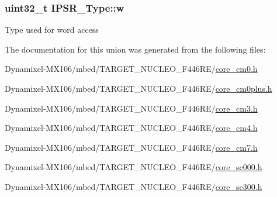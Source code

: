 \subsubsection[{\texorpdfstring{w}{w}}]{\setlength{\rightskip}{0pt plus 5cm}uint32\+\_\+t I\+P\+S\+R\+\_\+\+Type\+::w}\hypertarget{union_i_p_s_r___type_a4adca999d3a0bc1ae682d73ea7cfa879}{}\label{union_i_p_s_r___type_a4adca999d3a0bc1ae682d73ea7cfa879}
Type used for word access 

The documentation for this union was generated from the following files\+:\begin{DoxyCompactItemize}
\item 
Dynamixel-\/\+M\+X106/mbed/\+T\+A\+R\+G\+E\+T\+\_\+\+N\+U\+C\+L\+E\+O\+\_\+\+F446\+R\+E/\hyperlink{core__cm0_8h}{core\+\_\+cm0.\+h}\item 
Dynamixel-\/\+M\+X106/mbed/\+T\+A\+R\+G\+E\+T\+\_\+\+N\+U\+C\+L\+E\+O\+\_\+\+F446\+R\+E/\hyperlink{core__cm0plus_8h}{core\+\_\+cm0plus.\+h}\item 
Dynamixel-\/\+M\+X106/mbed/\+T\+A\+R\+G\+E\+T\+\_\+\+N\+U\+C\+L\+E\+O\+\_\+\+F446\+R\+E/\hyperlink{core__cm3_8h}{core\+\_\+cm3.\+h}\item 
Dynamixel-\/\+M\+X106/mbed/\+T\+A\+R\+G\+E\+T\+\_\+\+N\+U\+C\+L\+E\+O\+\_\+\+F446\+R\+E/\hyperlink{core__cm4_8h}{core\+\_\+cm4.\+h}\item 
Dynamixel-\/\+M\+X106/mbed/\+T\+A\+R\+G\+E\+T\+\_\+\+N\+U\+C\+L\+E\+O\+\_\+\+F446\+R\+E/\hyperlink{core__cm7_8h}{core\+\_\+cm7.\+h}\item 
Dynamixel-\/\+M\+X106/mbed/\+T\+A\+R\+G\+E\+T\+\_\+\+N\+U\+C\+L\+E\+O\+\_\+\+F446\+R\+E/\hyperlink{core__sc000_8h}{core\+\_\+sc000.\+h}\item 
Dynamixel-\/\+M\+X106/mbed/\+T\+A\+R\+G\+E\+T\+\_\+\+N\+U\+C\+L\+E\+O\+\_\+\+F446\+R\+E/\hyperlink{core__sc300_8h}{core\+\_\+sc300.\+h}\end{DoxyCompactItemize}
